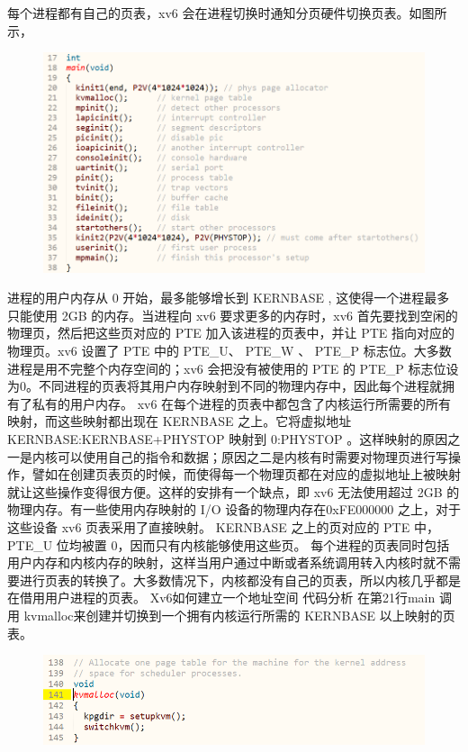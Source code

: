\documentclass[a4paper,12pt]{report}
\begin{document}
每个进程都有自己的页表，xv6 会在进程切换时通知分页硬件切换页表。如图所示，
\begin{figure}[H]
	\centering
	\includegraphics [width=1.0\textwidth]{figure//media//image5.png}
\end{figure}

进程的用户内存从 0 开始，最多能够增长到 KERNBASE , 这使得一个进程最多只能使用 2GB 的内存。当进程向 xv6 要求更多的内存时，xv6 首先要找到空闲的物理页，然后把这些页对应的 PTE 加入该进程的页表中，并让 PTE 指向对应的物理页。xv6 设置了 PTE 中的 PTE\_U、 PTE\_W 、 PTE\_P 标志位。大多数进程是用不完整个内存空间的；xv6 会把没有被使用的 PTE 的 PTE\_P 标志位设为0。不同进程的页表将其用户内存映射到不同的物理内存中，因此每个进程就拥有了私有的用户内存。
xv6 在每个进程的页表中都包含了内核运行所需要的所有映射，而这些映射都出现在 KERNBASE 之上。它将虚拟地址KERNBASE:KERNBASE+PHYSTOP 映射到 0:PHYSTOP 。这样映射的原因之一是内核可以使用自己的指令和数据；原因之二是内核有时需要对物理页进行写操作，譬如在创建页表页的时候，而使得每一个物理页都在对应的虚拟地址上被映射就让这些操作变得很方便。这样的安排有一个缺点，即 xv6 无法使用超过 2GB 的物理内存。有一些使用内存映射的 I/O 设备的物理内存在0xFE000000 之上，对于这些设备 xv6 页表采用了直接映射。 KERNBASE 之上的页对应的 PTE 中， PTE\_U 位均被置 0，因而只有内核能够使用这些页。
每个进程的页表同时包括用户内存和内核内存的映射，这样当用户通过中断或者系统调用转入内核时就不需要进行页表的转换了。大多数情况下，内核都没有自己的页表，所以内核几乎都是在借用用户进程的页表。
Xv6如何建立一个地址空间
代码分析
在第21行main 调用 kvmalloc来创建并切换到一个拥有内核运行所需的 KERNBASE 以上映射的页表。
\begin{figure}[H]
	\centering
	\includegraphics [width=1.0\textwidth]{figure//media//image6.png}
\end{figure}
\end{document}

